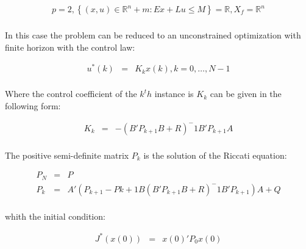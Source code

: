 		\begin{equation}
        \begin{array}{c}
         p=2, \left\{(x,u)\in\mathbb{R}^n+m:Ex+Lu\leq M\right\}=\mathbb{R},X_f=\mathbb{R}^n\\
        \end{array}
        \label{BASICMPC:equ:quadratic_case}
    \end{equation}
		
		In this case the problem can be reduced to an unconstrained optimization with finite horizon with the control law: 
		
		\begin{equation}
        \begin{array}{rcl}
         u^*(k)&=&K_kx(k), k=0,\dots,N-1\\
        \end{array}
        \label{BASICMPC:equ:control_law}
    \end{equation}
		
		Where the control coefficient of the $k^th$ instance is $K_k$ can be given in the following form:
		
		\begin{equation}
        \begin{array}{rcl}
         K_k&=&-(B'P_{k+1}B+R)^-1B'P_{k+1}A\\
        \end{array}
        \label{BASICMPC:equ:control_coefficient}
    \end{equation}
		
		The positive semi-definite matrix $P_k$ is the solution of the Riccati equation:
		
		\begin{equation}
        \begin{array}{rcl}
        P_N&=&P\\
				P_k&=&A'(P_{k+1}-P{k+1}B(B'P_{k+1}B+R)^-1B'P_{k+1})A+Q\\
        \end{array}
        \label{BASICMPC:equ:Riccati}
    \end{equation}
		
		whith the initial condition:
		
		\begin{equation}
        \begin{array}{rcl}
				J^*(x(0))&=&x(0)'P_0x(0)\\
        \end{array}
        \label{BASICMPC:equ:Riccati_initial}
    \end{equation}
		
